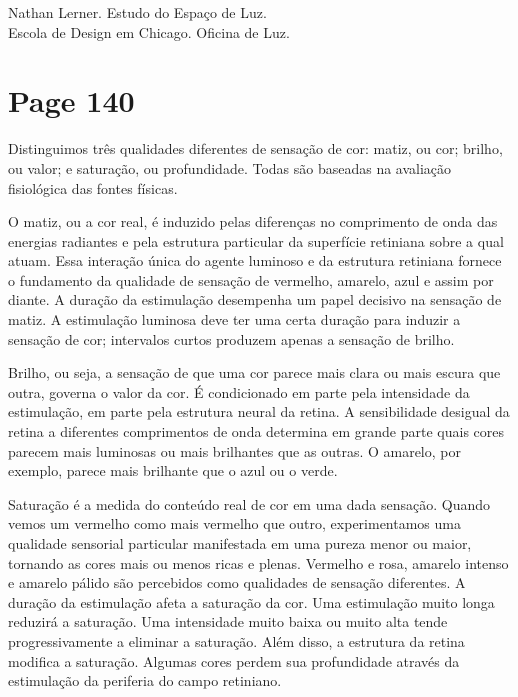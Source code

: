 \documentclass[a4paper]{article}
\begin{document}
Nathan Lerner. Estudo do Espaço de Luz.\\
Escola de Design em Chicago. Oficina de Luz.

\newpage
\section*{Page 140}


Distinguimos três qualidades diferentes de sensação de cor: matiz, ou cor; brilho, ou valor; e saturação, ou profundidade. Todas são baseadas na avaliação fisiológica das fontes físicas.

O matiz, ou a cor real, é induzido pelas diferenças no comprimento de onda das energias radiantes e pela estrutura particular da superfície retiniana sobre a qual atuam. Essa interação única do agente luminoso e da estrutura retiniana fornece o fundamento da qualidade de sensação de vermelho, amarelo, azul e assim por diante. A duração da estimulação desempenha um papel decisivo na sensação de matiz. A estimulação luminosa deve ter uma certa duração para induzir a sensação de cor; intervalos curtos produzem apenas a sensação de brilho.

Brilho, ou seja, a sensação de que uma cor parece mais clara ou mais escura que outra, governa o valor da cor. É condicionado em parte pela intensidade da estimulação, em parte pela estrutura neural da retina. A sensibilidade desigual da retina a diferentes comprimentos de onda determina em grande parte quais cores parecem mais luminosas ou mais brilhantes que as outras. O amarelo, por exemplo, parece mais brilhante que o azul ou o verde.

Saturação é a medida do conteúdo real de cor em uma dada sensação. Quando vemos um vermelho como mais vermelho que outro, experimentamos uma qualidade sensorial particular manifestada em uma pureza menor ou maior, tornando as cores mais ou menos ricas e plenas. Vermelho e rosa, amarelo intenso e amarelo pálido são percebidos como qualidades de sensação diferentes. A duração da estimulação afeta a saturação da cor. Uma estimulação muito longa reduzirá a saturação. Uma intensidade muito baixa ou muito alta tende progressivamente a eliminar a saturação. Além disso, a estrutura da retina modifica a saturação. Algumas cores perdem sua profundidade através da estimulação da periferia do campo retiniano.

\end{document}
